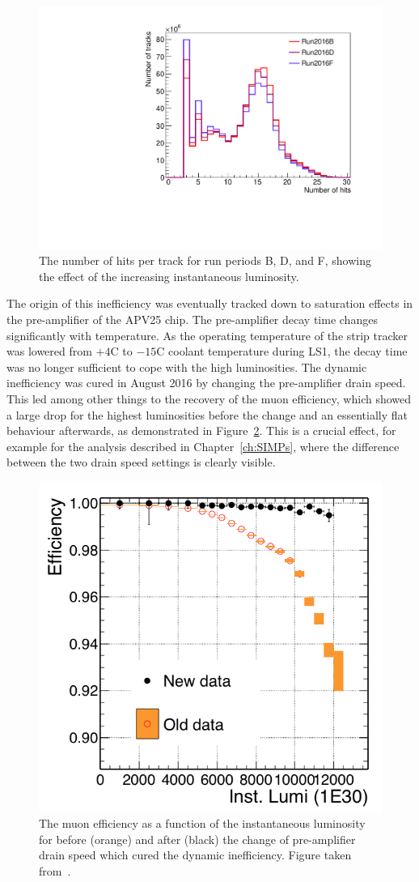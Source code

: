 \begin{figure}[ht]
  \centering
 \includegraphics[width=.6\textwidth]{nhits_perRunPeriod}
 \caption{The number of hits per track for run periods B, D, and F, showing the effect of the increasing instantaneous luminosity.}
 \label{fig:nhits}
\end{figure}

The origin of this inefficiency was eventually tracked down to saturation effects in the pre-amplifier of the APV25 chip. The pre-amplifier decay time changes significantly with temperature. As the operating temperature of the strip tracker was lowered from $+4$\degree C to $-15$\degree C coolant temperature during LS1, the decay time was no longer sufficient to cope with the high luminosities. The dynamic inefficiency was cured in August 2016 by changing the pre-amplifier drain speed. This led among other things to the recovery of the muon efficiency, which showed a large drop for the highest luminosities before the change and an essentially flat behaviour afterwards, as demonstrated in Figure~\ref{fig:muoneff}. This is a crucial effect, for example for the analysis described in Chapter~\ref{ch:SIMPs}, where the difference between the two drain speed settings is clearly visible.
  
\begin{figure}[ht]
  \centering
 \includegraphics[width=.6\textwidth]{APVsaturation_muoneff}
 \caption{The muon efficiency as a function of the instantaneous luminosity for before (orange) and after (black) the change of pre-amplifier drain speed which cured the dynamic inefficiency. Figure taken from~\cite{Erik}.}
 \label{fig:muoneff}
\end{figure}

\clearpage

\clearpage{\pagestyle{empty}\cleardoublepage}
